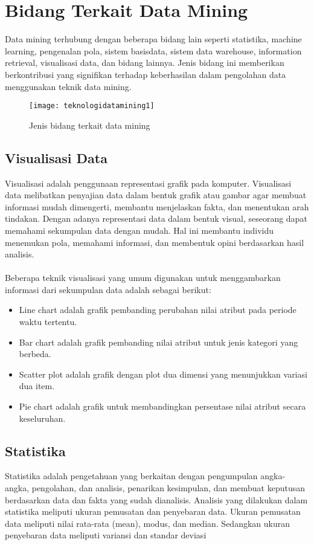 \newpage
\section{Bidang Terkait Data Mining}
Data mining terhubung dengan beberapa bidang lain seperti statistika, machine learning, pengenalan pola, sistem basisdata, sistem data warehouse, information retrieval, visualisasi data, dan bidang lainnya. Jenis bidang ini memberikan berkontribusi yang signifikan terhadap keberhasilan dalam pengolahan data menggunakan teknik data mining.

\begin{figure}[H]
	\centering
	\texttt{[image: teknologidatamining1]}
	\caption{Jenis bidang terkait data mining}
	\label{fig:rnaalgorithm}
\end{figure}

\subsection{Visualisasi Data} 
Visualisasi adalah penggunaan representasi grafik pada komputer. Visualisasi data melibatkan penyajian data dalam bentuk grafik atau gambar agar membuat informasi mudah dimengerti, membantu menjelaskan fakta, dan menentukan arah tindakan.  Dengan adanya representasi data dalam bentuk visual, seseorang dapat memahami sekumpulan data dengan mudah. Hal ini membantu individu  menemukan pola, memahami informasi, dan membentuk opini berdasarkan hasil analisis. 
\\\\
Beberapa teknik visualisasi yang umum digunakan untuk menggambarkan informasi dari sekumpulan data adalah sebagai berikut:

\begin{itemize}
\item Line chart adalah grafik pembanding perubahan nilai atribut pada periode waktu tertentu.
\item Bar chart adalah grafik pembanding nilai atribut untuk jenis kategori yang berbeda.
\item Scatter plot adalah grafik dengan plot dua dimensi yang menunjukkan variasi dua item.
\item Pie chart adalah grafik untuk membandingkan persentase nilai atribut secara keseluruhan.
\end{itemize}

\subsection{Statistika}
Statistika adalah pengetahuan yang berkaitan dengan pengumpulan angka-angka, pengolahan, dan analisis, penarikan kesimpulan, dan membuat keputusan berdasarkan data dan fakta yang sudah dianalisis. Analisis yang dilakukan dalam statistika meliputi ukuran pemusatan dan penyebaran data. Ukuran pemusatan data meliputi nilai rata-rata (mean), modus, dan median. Sedangkan ukuran penyebaran data meliputi variansi dan standar deviasi

